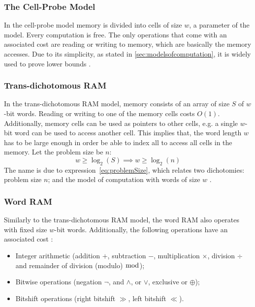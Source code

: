 \subsubsection{The Cell-Probe Model}
In the cell-probe model memory is divided into cells of size $w$, a parameter of the model. Every computation is free.
The only operations that come with an associated cost are reading or writing to memory, which are basically the memory accesses.
Due to its simplicity, as stated in \ref{sec:modelsofcomputation}, it is widely used to prove lower bounds \cite{erikdemainelec11}.

\subsubsection{Trans-dichotomous RAM}
In the trans-dichotomous RAM model, memory consists of an array of size $S$ of $w$-bit words.
Reading or writing to one of the memory cells costs $O(1)$.
Additionally, memory cells can be used as pointers to other cells, e.g. a single $w$-bit word can be used to access another cell.
This implies that, the word length $w$ has to be large enough in order be able to index all to access all cells in the memory.
Let the problem size be $n$:
\begin{equation}\label{eq:problemSize}
    w \ge \log_2(S) \implies w \ge \log_2(n)
\end{equation}
The name is due to expression~\ref{eq:problemSize}, which relates two dichotomies: problem size $n$; and the model of computation with words of size $w$ \cite{erikdemainelec11}. 

\subsubsection{Word RAM}
Similarly to the trans-dichotomous RAM model, the word RAM also operates with fixed size $w$-bit words. Additionally, the following operations have an associated cost \cite{nelsonjelanilec1}:
\begin{itemize}
    \item Integer arithmetic (addition $+$, subtraction $-$, multiplication $\times$, division $\div$ and remainder of division (modulo) $\bmod$);
    \item Bitwise operations (negation $\neg$, and $\wedge$, or $\vee$, exclusive or $\oplus$);
    \item Bitshift operations (right bitshift $\gg$, left bitshift $\ll$).
\end{itemize}

